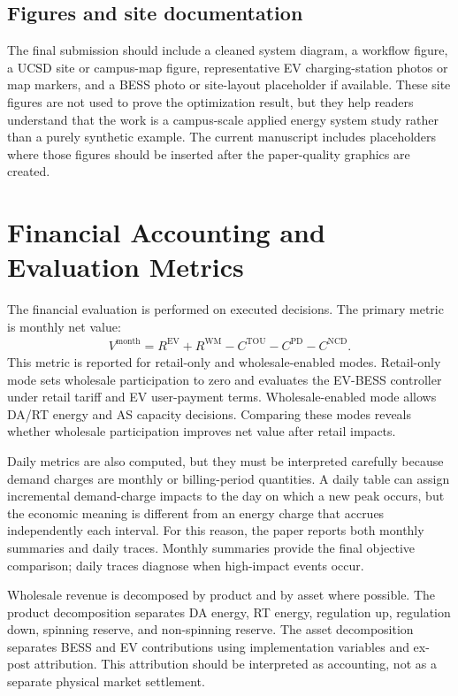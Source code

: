 \documentclass[final,5p,times]{elsarticle}
\newcommand{\EV}{\mathrm{EV}}
\newcommand{\TOU}{\mathrm{TOU}}
\newcommand{\PD}{\mathrm{PD}}
\newcommand{\NCD}{\mathrm{NCD}}
\newcommand{\WM}{\mathrm{WM}}
\begin{document}
\subsection{Figures and site documentation}
The final submission should include a cleaned system diagram, a workflow figure, a UCSD site or campus-map figure, representative EV charging-station photos or map markers, and a BESS photo or site-layout placeholder if available. These site figures are not used to prove the optimization result, but they help readers understand that the work is a campus-scale applied energy system study rather than a purely synthetic example. The current manuscript includes placeholders where those figures should be inserted after the paper-quality graphics are created.


\section{Financial Accounting and Evaluation Metrics}
\label{sec:metrics}

The financial evaluation is performed on executed decisions. The primary metric is monthly net value:
\begin{align}
V^{\mathrm{month}}=R^{\EV}+R^{\WM}-C^{\TOU}-C^{\PD}-C^{\NCD}.
\label{eq:month_value_metric}
\end{align}
This metric is reported for retail-only and wholesale-enabled modes. Retail-only mode sets wholesale participation to zero and evaluates the EV-BESS controller under retail tariff and EV user-payment terms. Wholesale-enabled mode allows DA/RT energy and AS capacity decisions. Comparing these modes reveals whether wholesale participation improves net value after retail impacts.

Daily metrics are also computed, but they must be interpreted carefully because demand charges are monthly or billing-period quantities. A daily table can assign incremental demand-charge impacts to the day on which a new peak occurs, but the economic meaning is different from an energy charge that accrues independently each interval. For this reason, the paper reports both monthly summaries and daily traces. Monthly summaries provide the final objective comparison; daily traces diagnose when high-impact events occur.

Wholesale revenue is decomposed by product and by asset where possible. The product decomposition separates DA energy, RT energy, regulation up, regulation down, spinning reserve, and non-spinning reserve. The asset decomposition separates BESS and EV contributions using implementation variables and ex-post attribution. This attribution should be interpreted as accounting, not as a separate physical market settlement.
\end{document}
